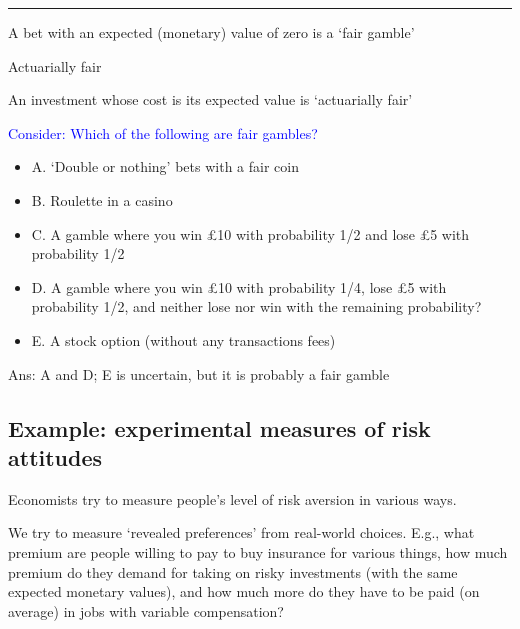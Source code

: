 \documentclass[]{article}
\providecommand{\tightlist}{%
  \setlength{\itemsep}{0pt}\setlength{\parskip}{0pt}}
\begin{document}
\begin{center}\rule{0.5\linewidth}{\linethickness}\end{center}

\begin{description}
\tightlist
\item[Fair gamble]
A bet with an expected (monetary) value of zero is a `fair gamble'
\end{description}

\bigskip

Actuarially fair

An investment whose cost is its expected value is `actuarially fair'

\bigskip

\textcolor{blue}{Consider: Which of the following are fair gambles?}

\begin{itemize}
\tightlist
\item
  A. `Double or nothing' bets with a fair coin
\item
  B. Roulette in a casino
\item
  C. A gamble where you win £10 with probability 1/2 and lose £5 with probability 1/2
\item
  D. A gamble where you win £10 with probability 1/4, lose £5 with probability 1/2, and neither lose nor win with the remaining probability?
\item
  E. A stock option (without any transactions fees)
\end{itemize}

Ans: A and D; E is uncertain, but it is probably a fair gamble

\hypertarget{example-experimental-measures-of-risk-attitudes}{%
\subsection{Example: experimental measures of risk attitudes}\label{example-experimental-measures-of-risk-attitudes}}

Economists try to measure people's level of risk aversion in various ways.

We try to measure `revealed preferences' from real-world choices. E.g., what premium are people willing to pay to buy insurance for various things, how much premium do they demand for taking on risky investments (with the same expected monetary values), and how much more do they have to be paid (on average) in jobs with variable compensation?

\bigskip
\end{document}

